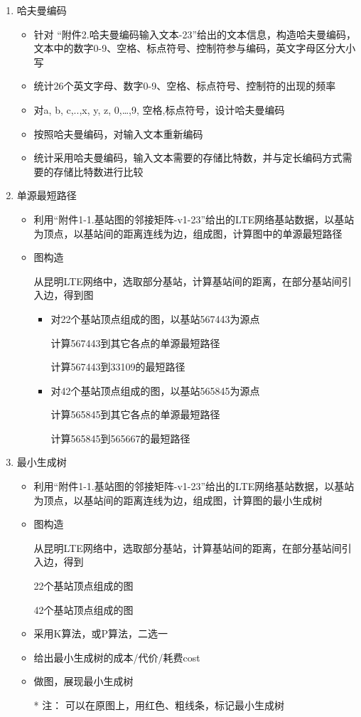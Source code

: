\documentclass[lang=cn,11pt,a4paper]{elegantpaper}
\begin{document}
\begin{enumerate}
    \item 哈夫曼编码
    \begin{itemize}
        \item 针对 “附件2.哈夫曼编码输入文本-23”给出的文本信息，构造哈夫曼编码，文本中的数字0-9、空格、标点符号、控制符参与编码，英文字母区分大小写
        \item 统计26个英文字母、数字0-9、空格、标点符号、控制符的出现的频率
        \item 对{a, b, c,..,x, y, z, 0,…,9, 空格,标点符号}，设计哈夫曼编码
        \item 按照哈夫曼编码，对输入文本重新编码
        \item 统计采用哈夫曼编码，输入文本需要的存储比特数，并与定长编码方式需要的存储比特数进行比较
    \end{itemize}
    \item 单源最短路径
    \begin{itemize}
        \item 利用“附件1-1.基站图的邻接矩阵-v1-23”给出的LTE网络基站数据，以基站为顶点，以基站间的距离连线为边，组成图，计算图中的单源最短路径
        \item 图构造
        
        从昆明LTE网络中，选取部分基站，计算基站间的距离，在部分基站间引入边，得到图
        \begin{itemize}
            \item 对22个基站顶点组成的图，以基站567443为源点
             
             计算567443到其它各点的单源最短路径
             
             计算567443到33109的最短路径

            \item 对42个基站顶点组成的图，以基站565845为源点
            
            计算565845到其它各点的单源最短路径
            
            计算565845到565667的最短路径

        \end{itemize}
    \end{itemize}
    \item 最小生成树
    \begin{itemize}
        \item 利用“附件1-1.基站图的邻接矩阵-v1-23”给出的LTE网络基站数据，以基站为顶点，以基站间的距离连线为边，组成图，计算图的最小生成树
        \item 图构造
        
        从昆明LTE网络中，选取部分基站，计算基站间的距离，在部分基站间引入边，得到
        
        22个基站顶点组成的图 
        
        42个基站顶点组成的图
        \item 采用K算法，或P算法，二选一
        \item 给出最小生成树的成本/代价/耗费cost
        \item 做图，展现最小生成树
        
        * 注： 可以在原图上，用红色、粗线条，标记最小生成树
    \end{itemize}
\end{enumerate}
\end{document}
